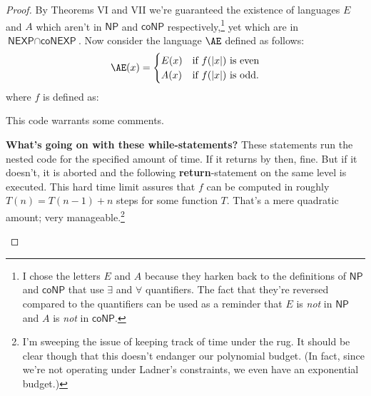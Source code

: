 \documentclass{article}
\newcommand{\nameditem}[1]{\item\textbf{#1}}
\newcommand{\NP}{\ensuremath{\textsf{NP}}}
\newcommand{\coNP}{\ensuremath{\textsf{coNP}}}
\newcommand{\interEXP}{\ensuremath{\textsf{NEXP}\cap\textsf{coNEXP}}}
\begin{document}
\begin{proof}
By Theorems VI and VII we're guaranteed the existence of languages $E$ and $A$ which aren't in $\NP$ and $\coNP$ respectively,\footnote{I chose the letters $E$ and $A$ because they harken back to the definitions of $\NP$ and $\coNP$ that use $\exists$ and $\forall$ quantifiers. The fact that they're reversed compared to the quantifiers can be used as a reminder that $E$ is \textit{not} in $\NP$ and $A$ is \textit{not} in $\coNP$.} yet which are in $\interEXP$. Now consider the language $\AE$ defined as follows:
\[
\AE(x) =
\begin{cases}
E(x) & \text{if $f(|x|)$ is even}\\
A(x) & \text{if $f(|x|)$ is odd.}\\
\end{cases}
\]
where $f$ is defined as:
\begin{algorithm}[H]
\caption*{$f(n)$}
\begin{algorithmic}
  \State {}
\EndIf
{}
        \State {}
      \EndIf
    \EndFor
  \EndWhile
  \State {}
\EndIf
{}
        \State {}
      \EndIf
    \EndFor
  \EndWhile
  \State {}
\EndIf
\end{algorithmic}
\end{algorithm}
\noindent
This code warrants some comments.
\begin{description}
\nameditem{What's going on with these while-statements?} These statements run the nested code for the specified amount of time. If it returns by then, fine. But if it doesn't, it is aborted and the following \textbf{return}-statement on the same level is executed. This hard time limit assures that $f$ can be computed in roughly $T(n) = T(n-1) + n$ steps for some function $T$. That's a mere quadratic amount; very manageable.\footnote{I'm sweeping the issue of keeping track of time under the rug. It should be clear though that this doesn't endanger our polynomial budget. (In fact, since we're not operating under Ladner's constraints, we even have an exponential budget.)}

\end{description}
\end{proof}
\end{document}
